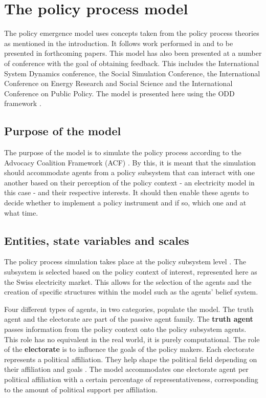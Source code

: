 \section{The policy process model}
\label{sec:CodeDocPolicy}

The policy emergence model uses concepts taken from the policy process theories as mentioned in the introduction. It follows work performed in \cite{klein2017emergence} and to be presented in forthcoming papers. This model has also been presented at a number of conference with the goal of obtaining feedback. This includes the International System Dynamics conference, the Social Simulation Conference, the International Conference on Energy Research and Social Science and the International Conference on Public Policy. The model is presented here using the ODD framework \citep{grimm2010odd}.

\subsection{Purpose of the model}
\label{sec:purpose}

The purpose of the model is to simulate the policy process according to the Advocacy Coalition Framework (ACF) \citep{sabatier2007ACF}. By this, it is meant that the simulation should accommodate agents from a policy subsystem that can interact with one another based on their perception of the policy context - an electricity model in this case - and their respective interests. It should then enable these agents to decide whether to implement a policy instrument and if so, which one and at what time.


\subsection{Entities, state variables and scales}
\label{ssec:entities}

The policy process simulation takes place at the policy subsystem level \citep{sabatier2007ACF}. The subsystem is selected based on the policy context of interest, represented here as the Swiss electricity market. This allows for the selection of the agents and the creation of specific structures within the model such as the agents' belief system.

Four different types of agents, in two categories, populate the model. The truth agent and the electorate are part of the passive agent family. The {\bfseries truth agent} passes information from the policy context onto the policy subsystem agents. This role has no equivalent in the real world, it is purely computational. The role of the {\bfseries electorate} is to influence the goals of the policy makers. Each electorate represents a political affiliation. They help shape the political field depending on their affiliation and goals \citep{laver2011party}. The model accommodates one electorate agent per political affiliation with a certain percentage of representativeness, corresponding to the amount of political support per affiliation.

